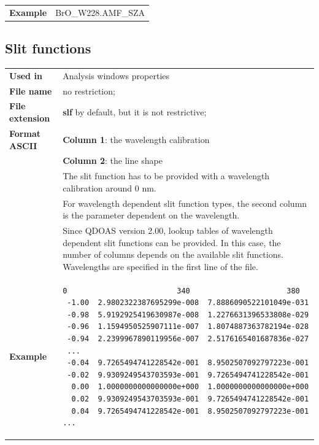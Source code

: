 \begin{minipage}[t]{\textwidth}
\begin{tabular}[h]{l p{8cm}}
\textbf{Example} &  BrO\_W228.AMF\_SZA
\end{tabular}
\end{minipage}

\subsection{Slit functions}\hfill
\begin{minipage}[t]{\textwidth}
\vspace{-0.6\baselineskip}
\begin{tabular}[h]{l p{9cm}}
\textbf{Used in} & Analysis windows properties	\\ [6pt]
\textbf{File name} & no restriction; \\ [6pt]
\textbf{File extension} & \textbf{slf}  by default, but it is not restrictive; \\ [6pt]
\textbf{Format ASCII} & \textbf{Column 1}: the wavelength calibration \\
                      & \textbf{Column 2}: the line shape \\ [6pt]
                      & The slit function has to be provided with a wavelength calibration around 0 nm.  \\ [6pt]
                      & For wavelength dependent slit function types, the second column is the parameter dependent on the wavelength. \\ [6pt]
                      &	Since QDOAS version 2.00, lookup tables of wavelength dependent slit functions can be provided.  In this case, the number of columns depends on the available slit functions.  Wavelengths are specified in the first line of the file.  \\ [6pt]
\textbf{Example} &
\begin{minipage}[t]{\textwidth}
\vspace{-0.6\baselineskip}
\begin{Verbatim}[fontfamily=courier,fontsize=\relsize{-2}]
  0                         340                      380
 -1.00  2.9802322387695299e-008  7.8886090522101049e-031
 -0.98  5.9192925419630987e-008  1.2276631396533808e-029
 -0.96  1.1594950525907111e-007  1.8074887363782194e-028
 -0.94  2.2399967890119956e-007  2.5176165401687836e-027
 ...
 -0.04  9.7265494741228542e-001  8.9502507092797223e-001
 -0.02  9.9309249543703593e-001  9.7265494741228542e-001
  0.00  1.0000000000000000e+000  1.0000000000000000e+000
  0.02  9.9309249543703593e-001  9.7265494741228542e-001
  0.04  9.7265494741228542e-001  8.9502507092797223e-001
...

\end{Verbatim}
\end{minipage}
\end{tabular}
\end{minipage}
